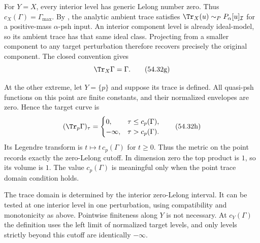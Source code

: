 \begin{example}
\label{ex:operations-ambient-point-trace}
For $Y=X$, every interior level has generic Lelong number zero.
Thus $c_X(\Gamma)=\Gamma_{\max}$.
By \cite[Example~8.1.5]{XiaBook}, the analytic ambient trace satisfies
$\Tr_X(u)\sim_P P_\alpha[u]_{\mathcal I}$ for a positive-mass
$\alpha$-psh input.  An interior component level is already ideal-model,
so its ambient trace has that same ideal class.
Projecting from a smaller component to any target perturbation therefore
recovers precisely the original component.  The closed convention gives
\[
                         \Tr_X\Gamma=\Gamma.
\tag{54.32g}\label{eq:operations-ambient-trace}
\]

At the other extreme, let $Y=\{p\}$ and suppose its trace is defined.
All quasi-psh functions on this point are finite constants, and their
normalized envelopes are zero.  Hence the target curve is
\[
 (\Tr_p\Gamma)_\tau=
 \begin{cases}
 0,&\tau\leq c_p(\Gamma),\\
 -\infty,&\tau>c_p(\Gamma).
 \end{cases}
\tag{54.32h}\label{eq:operations-point-trace}
\]
Its Legendre transform is $t\mapsto t\,c_p(\Gamma)$ for $t\geq0$.
Thus the metric on the point records exactly the zero-Lelong cutoff.
In dimension zero the top product is $1$, so its volume is $1$.
The value $c_p(\Gamma)$ is meaningful only when the point trace domain
condition holds.
\end{example}

\begin{remark}
\label{rem:operations-trace-firewall}
The trace domain is determined by the interior zero-Lelong interval.
It can be tested at one interior level in one perturbation, using
compatibility and monotonicity as above.
Pointwise finiteness along $Y$ is not necessary.
At $c_Y(\Gamma)$ the definition uses the left limit of normalized
target levels, and only levels strictly beyond this cutoff are
identically $-\infty$.
\end{remark}

